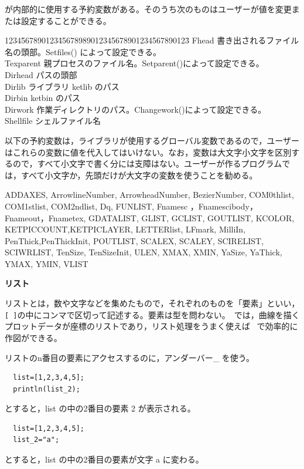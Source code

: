 \documentclass[papersize,a4paper,12pt,uplatex]{jsarticle}
\begin{document}
 \ketcindy  が内部的に使用する予約変数がある。そのうち次のものはユーザーが値を変更または設定することができる。
\begin{tabbing}
1234\=567890123\=45678989012345678901234567890123\=\kill
  \>Fhead  \>書き出されるファイル名の頭部。Setfiles() によって設定できる。\\
  \>Texparent  \>親プロセスのファイル名。Setparent()によって設定できる。\\
  \>Dirhead  \>パスの頭部\\
  \>Dirlib  \>ライブラリ ketlib のパス\\
  \>Dirbin  \>ketbin のパス\\
  \>Dirwork  \>作業ディレクトリのパス。Changework()によって設定できる。\\
  \>Shellfile  \>シェルファイル名
\end{tabbing}

以下の予約変数は，ライブラリが使用するグローバル変数であるので，ユーザーはこれらの変数に値を代入してはいけない。なお，変数は大文字小文字を区別するので，すべて小文字で書く分には支障はない。ユーザーが作るプログラムでは，すべて小文字か，先頭だけが大文字の変数を使うことを勧める。

\vspace{\baselineskip}
ADDAXES, ArrowlineNumber, ArrowheadNumber, BezierNumber, COM0thlist, COM1stlist, COM2ndlist, Dq, FUNLIST, Fnamesc ，Fnamescibody，Fnameout，Fnametex, GDATALIST, GLIST, GCLIST, GOUTLIST, KCOLOR, KETPICCOUNT,KETPICLAYER, LETTERlist, LFmark, MilliIn, PenThick,PenThickInit,  POUTLIST, SCALEX, SCALEY, SCIRELIST, SCIWRLIST, TenSize, TenSizeInit, ULEN, XMAX, XMIN, YaSize, YaThick,   YMAX, YMIN, VLIST


\vspace{\baselineskip}
{\bf  リスト}

リストとは，数や文字などを集めたもので，それぞれのものを「要素」といい，\verb|[ ]|の中にコンマで区切って記述する。要素は型を問わない。\ketcindy\ では，曲線を描くプロットデータが座標のリストであり，リスト処理をうまく使えば \ketcindy\ で効率的に作図ができる。

リストのn番目の要素にアクセスするのに，アンダーバー\_ を使う。

\begin{verbatim}
  list=[1,2,3,4,5];
  println(list_2);
\end{verbatim}
とすると，list の中の2番目の要素 2 が表示される。
\begin{verbatim}
  list=[1,2,3,4,5];
  list_2="a";
\end{verbatim}
とすると，list の中の2番目の要素が文字 a に変わる。
\end{document}
